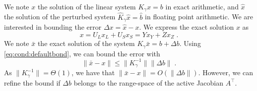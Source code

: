 We note $x$ the solution of the linear system $K_\gamma x = b$
in exact arithmetic, and $\widehat{x}$ the solution of
the perturbed system $\widehat{K}_\gamma \widehat{x} = \widehat{b}$
in floating point arithmetic. We are interested in bounding
the error $\Delta x = \widehat{x} - x$. We express
the exact solution $x$ as
\begin{equation}
  x = U_L x_L + U_S x_S = Y x_Y + Z x_Z \; .
\end{equation}
We note $\bar{x}$ the exact solution of the system
$K_\gamma \bar{x} = b + \Delta b$. Using \eqref{eq:cond:defaultbond},
we can bound the error with
\begin{equation}
  \| \bar{x} - x\| \leq \| K_\gamma^{-1} \| \|\Delta b \| \; .
\end{equation}
As $\| K_\gamma^{-1}\| = \Theta(1)$, we have that
$\| \bar{x} - x \| = O(\|\Delta b \|)$. However, we can
refine the bound if $\Delta b$ belongs to the range-space
of the active Jacobian $A^\top$.

